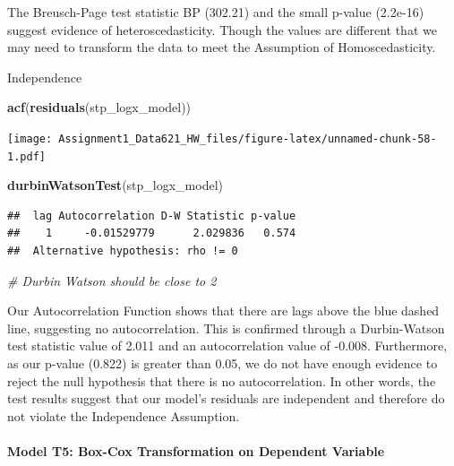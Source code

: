 \documentclass[
]{article}
\newenvironment{Shaded}{\begin{snugshade}}{\end{snugshade}}
\newcommand{\CommentTok}[1]{\textcolor[rgb]{0.56,0.35,0.01}{\textit{#1}}}
\newcommand{\FunctionTok}[1]{\textcolor[rgb]{0.13,0.29,0.53}{\textbf{#1}}}
\newcommand{\NormalTok}[1]{#1}
\begin{document}
The Breusch-Page test statistic BP (302.21) and the small p-value
(2.2e-16) suggest evidence of heteroscedasticity. Though the values are
different that we may need to transform the data to meet the Assumption
of Homoscedasticity.

Independence

\begin{Shaded}
\begin{Highlighting}[]
\FunctionTok{acf}\NormalTok{(}\FunctionTok{residuals}\NormalTok{(stp\_logx\_model))}
\end{Highlighting}
\end{Shaded}

\texttt{[image: Assignment1\_Data621\_HW\_files/figure-latex/unnamed-chunk-58-1.pdf]}

\begin{Shaded}
\begin{Highlighting}[]
\FunctionTok{durbinWatsonTest}\NormalTok{(stp\_logx\_model)}
\end{Highlighting}
\end{Shaded}

\begin{verbatim}
##  lag Autocorrelation D-W Statistic p-value
##    1     -0.01529779      2.029836   0.574
##  Alternative hypothesis: rho != 0
\end{verbatim}

\begin{Shaded}
\begin{Highlighting}[]
\CommentTok{\# Durbin Watson should be close to 2}
\end{Highlighting}
\end{Shaded}

Our Autocorrelation Function shows that there are lags above the blue
dashed line, suggesting no autocorrelation. This is confirmed through a
Durbin-Watson test statistic value of 2.011 and an autocorrelation value
of -0.008. Furthermore, as our p-value (0.822) is greater than 0.05, we
do not have enough evidence to reject the null hypothesis that there is
no autocorrelation. In other words, the test results suggest that our
model's residuals are independent and therefore do not violate the
Independence Assumption.

\paragraph{Model T5: Box-Cox Transformation on Dependent
Variable}\label{model-t5-box-cox-transformation-on-dependent-variable}
\end{document}
